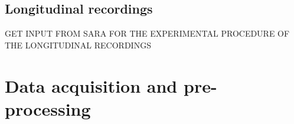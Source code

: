 \subsection{Longitudinal recordings}
GET INPUT FROM SARA FOR THE EXPERIMENTAL PROCEDURE OF THE LONGITUDINAL RECORDINGS
\section{Data acquisition and pre-processing}
\label{chap3:sec:2:preproc}

